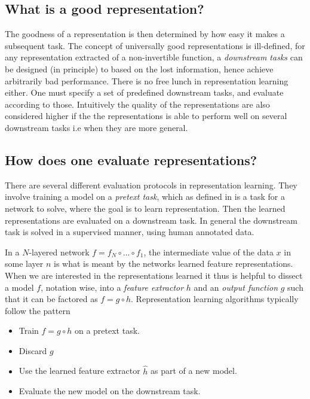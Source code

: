 \documentclass[../../thesis.tex]{subfiles}
\begin{document}
\subsection{What is a good representation?}

The goodness of a representation is then determined by how easy it makes a subsequent task. The concept of universally good representations is ill-defined, for any representation extracted of a non-invertible function, a \textit{downstream tasks} can be designed (in principle) to based on the lost information, hence achieve arbitrarily bad performance. There is no free lunch in representation learning either. One must specify a set of predefined downstream tasks, and evaluate according to those. Intuitively the quality of the representations are also considered higher if the the representations is able to perform well on several downstream tasks i.e when they are more general. 

\subsection{How does one evaluate representations?}
There are several different evaluation protocols in representation learning. They involve training a model on a \textit{pretext task}, which as defined in \cite{jing2019selfsupervised} is a task for a network to solve, where the goal is to learn representation. Then the learned representations are evaluated on a downstream task. In general the downstream task is solved in a supervised manner, using human annotated data.\newline

In a $N$-layered network $f = f_N\circ ...\circ f_1$, the intermediate value of the data $x$ in some layer $n$ is what is meant by the networks learned feature representations. When we are interested in the representations learned it thus is helpful to dissect a model $f$, notation wise, into a \textit{feature extractor} $h$ and an \textit{output function} $g$ such that it can be factored as $f = g \circ h$. Representation learning algorithms typically follow the pattern
\begin{itemize}
    \item Train $f= g \circ h$ on a pretext task.
    \item Discard $g$
    \item Use the learned feature extractor $\widehat{h}$ as part of a new model.
    \item Evaluate the new model on the downstream task. 
\end{itemize}
\end{document}
